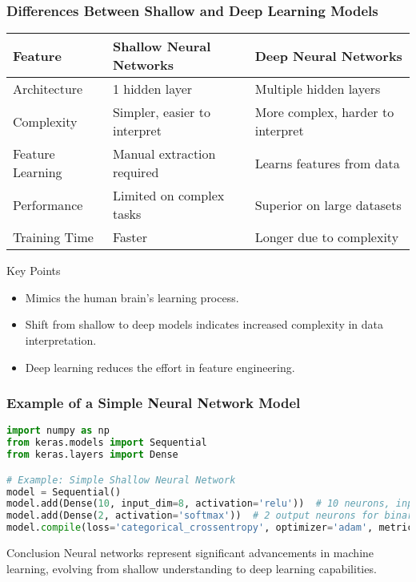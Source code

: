 \documentclass{beamer}
\begin{document}
\begin{frame}
    \frametitle{Differences Between Shallow and Deep Learning Models}
    \begin{center}
        \begin{tabular}{|l|l|l|}
            \hline
            \textbf{Feature} & \textbf{Shallow Neural Networks} & \textbf{Deep Neural Networks} \\
            \hline
            Architecture & 1 hidden layer & Multiple hidden layers \\
            Complexity & Simpler, easier to interpret & More complex, harder to interpret  \\
            Feature Learning & Manual extraction required & Learns features from data \\
            Performance & Limited on complex tasks & Superior on large datasets \\
            Training Time & Faster & Longer due to complexity \\
            \hline
        \end{tabular}
    \end{center}

    \begin{block}{Key Points}
        \begin{itemize}
            \item Mimics the human brain's learning process.
            \item Shift from shallow to deep models indicates increased complexity in data interpretation.
            \item Deep learning reduces the effort in feature engineering.
        \end{itemize}
    \end{block}
\end{frame}

\begin{frame}[fragile]
    \frametitle{Example of a Simple Neural Network Model}
    \begin{lstlisting}[language=Python]
import numpy as np
from keras.models import Sequential
from keras.layers import Dense

# Example: Simple Shallow Neural Network
model = Sequential()
model.add(Dense(10, input_dim=8, activation='relu'))  # 10 neurons, input size of 8
model.add(Dense(2, activation='softmax'))  # 2 output neurons for binary classification
model.compile(loss='categorical_crossentropy', optimizer='adam', metrics=['accuracy'])
    \end{lstlisting}
    
    \begin{block}{Conclusion}
        Neural networks represent significant advancements in machine learning, evolving from shallow understanding to deep learning capabilities.
    \end{block}
\end{frame}
\end{document}
